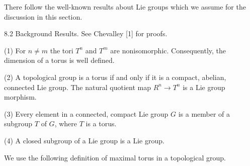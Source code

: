 There follow the well-known results about Lie groups which we assume for the discussion in this section.

8.2 Background Results. See Chevalley [1] for proofs.

(1) For $n \neq m$ the tori $T^n$ and $T^m$ are nonisomorphic. Consequently, the dimension of a torus is well defined.

(2) A topological group is a torus if and only if it is a compact, abelian, connected Lie group. The natural quotient map $R^n \rightarrow T^n$ is a Lie group morphism.

(3) Every element in a connected, compact Lie group $G$ is a member of a subgroup $T$ of $G$, where $T$ is a torus.

(4) A closed subgroup of a Lie group is a Lie group.

We use the following definition of maximal torus in a topological group.
